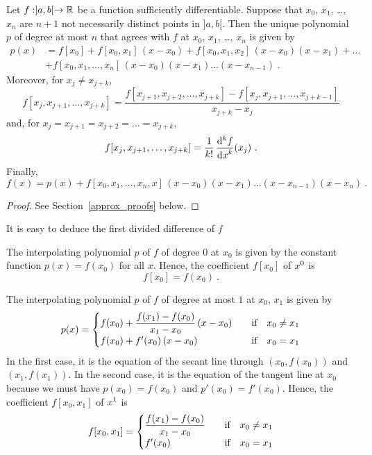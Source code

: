 \begin{theorem}
Let $f: ]a,b[ \rightarrow \mathbb{R}$ be a function sufficiently
differentiable.  Suppose that $x_0$, $x_1$, \ldots, $x_n$ are
$n+1$ not necessarily distinct points in $]a,b[$.
Then the unique polynomial $p$ of degree at most $n$ that agrees with
$f$ at $x_0$, $x_1$, \ldots, $x_n$ is given by
\begin{equation} \label{NFDDF}
\begin{split}
p(x) &= f[x_0]+f[x_0,x_1]\,(x-x_0) +
f[x_0,x_1,x_2]\,(x-x_0)(x-x_1) + \ldots \\
 &+f[x_0,x_1,\dots,x_n]\,(x-x_0)(x-x_1)\dots(x-x_{n-1}) \ .
\end{split}
\end{equation}
Moreover, for $x_j \neq x_{j+k}$,
\begin{equation}\label{divide1}
f[x_j,x_{j+1},\dots,x_{j+k}] =
\frac{f[x_{j+1},x_{j+2},\dots,x_{j+k}]-f[x_j,x_{j+1},\dots,x_{j+k-1}]}
{x_{j+k}-x_j}
\end{equation}
and, for $x_j = x_{j+1} = x_{j+2} = \ldots = x_{j+k}$,
\begin{equation}\label{divide2}
f[x_j,x_{j+1},\dots,x_{j+k}] = \frac{1}{k!}\,\dydxn{f}{x}{k}(x_j) \ .
\end{equation}
Finally,
\begin{equation} \label{IPerror}
f(x) = p(x) +
f[x_0,x_1,\dots,x_n,x]\,(x-x_0)(x-x_1)\dots(x-x_{n-1})(x-x_n) \ .
\end{equation}
\label{InterpTh}
\end{theorem}

\begin{proof}
See Section~\ref{approx_proofs} below.
\end{proof}

It is easy to deduce the first divided difference of $f$

  The interpolating polynomial $p$ of $f$ of degree $0$ at
$x_0$ is given by the constant function $p(x) = f(x_0)$ for all $x$.
Hence, the coefficient $f[x_0]$ of $\displaystyle x^0$ is
\[
f[x_0] = f(x_0) \ .
\]

 The interpolating polynomial $p$ of $f$ of degree at most
$1$ at $x_0$, $x_1$ is given by
\[
p(x) = \begin{cases} \displaystyle
f(x_0) + \frac{f(x_1)-f(x_0)}{x_1-x_0} \, (x-x_0) & \quad \text{if} \quad
x_0 \neq x_1 \\
f(x_0) + f'(x_0)\, (x-x_0) & \quad \text{if} \quad x_0 = x_1
\end{cases}
\]
In the first case, it is the equation of the secant line through
$(x_0,f(x_0))$ and $(x_1,f(x_1))$.  In the second case, it is the
equation of the tangent line at $x_0$ because we must have
$p(x_0)=f(x_0)$ and $p'(x_0) = f'(x_0)$.  Hence, the coefficient
$f[x_0,x_1]$ of $\displaystyle x^1$ is
\[
f[x_0,x_1] = \begin{cases}
\displaystyle \frac{f(x_1)-f(x_0)}{x_1-x_0} & \quad \text{if} \quad
x_0 \neq x_1 \\
f'(x_0) & \quad \text{if} \quad x_0 = x_1
\end{cases}
\]

